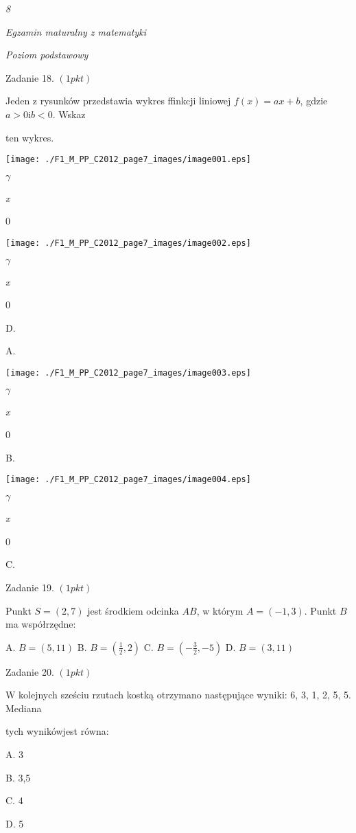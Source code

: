 \documentclass[a4paper,12pt]{article}
\begin{document}
{\it 8}

{\it Egzamin maturalny z matematyki}

{\it Poziom podstawowy}

Zadanie 18. $(1pkt)$

Jeden z rysunków przedstawia wykres ffinkcji liniowej $f(x)=ax+b$, gdzie $a>0\mathrm{i}b<0$. Wskaz

ten wykres.
\begin{center}
\texttt{[image: ./F1\_M\_PP\_C2012\_page7\_images/image001.eps]}
\end{center}
$\gamma$

{\it x}

0
\begin{center}
\texttt{[image: ./F1\_M\_PP\_C2012\_page7\_images/image002.eps]}
\end{center}
$\gamma$

{\it x}

0

D.

A.
\begin{center}
\texttt{[image: ./F1\_M\_PP\_C2012\_page7\_images/image003.eps]}
\end{center}
$\gamma$

{\it x}

0

B.
\begin{center}
\texttt{[image: ./F1\_M\_PP\_C2012\_page7\_images/image004.eps]}
\end{center}
$\gamma$

{\it x}

0

C.

Zadanie 19. $(1pkt)$

Punkt $S=(2,7)$ jest środkiem odcinka $AB$, w którym $A=(-1,3)$. Punkt $B$ ma współrzędne:

A. $B=(5,11)$ B. $B=(\displaystyle \frac{1}{2},2)$ C. $B=(-\displaystyle \frac{3}{2},-5)$ D. $B=(3,11)$

Zadanie 20. $(1pkt)$

$\mathrm{W}$ kolejnych sześciu rzutach kostką otrzymano następujące wyniki: 6, 3, 1, 2, 5, 5. Mediana

tych wynikówjest równa:

A. 3

B. 3,5

C. 4

D. 5
\end{document}
